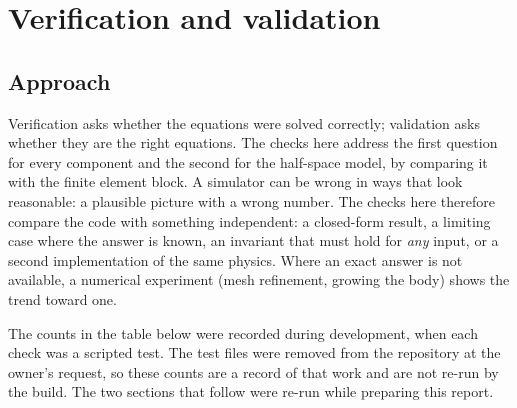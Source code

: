 \chapter{Verification and validation}
\label{ch:verify}

\section{Approach}
Verification asks whether the equations were solved correctly; validation asks whether they are the right equations. The checks here address the first question for every component and the second for the half-space model, by comparing it with the finite element block. A simulator can be wrong in ways that look reasonable: a plausible picture with a wrong number. The checks here therefore compare the code with something independent: a closed-form result, a limiting case where the answer is known, an invariant that must hold for \emph{any} input, or a second implementation of the same physics. Where an exact answer is not available, a numerical experiment (mesh refinement, growing the body) shows the trend toward one.


The counts in the table below were recorded during development, when each check was a scripted test. The test files were removed from the repository at the owner's request, so these counts are a record of that work and are not re-run by the build. The two sections that follow were re-run while preparing this report.

